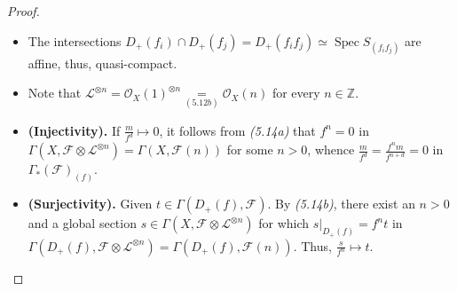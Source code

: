 \documentclass[11pt,a4paper,footinclude=true,headinclude=true]{scrbook} %
\DeclareMathOperator{\Spec}{Spec}
\newcommand{\FF}{\mathscr{F}}
\newcommand{\LL}{\mathscr{L}}
\newcommand{\OO}{\mathcal{O}}
\newcommand{\<}{\langle}
\newcommand{\>}{\rangle}
\begin{document}
\begin{proof}
\begin{itemize}
\begin{itemize}
             \item The intersections $D_+(f_i)\cap D_+(f_j)=D_+(f_if_j)\simeq\Spec S_{(f_if_j)}$ are affine, thus, quasi-compact.
             \item Note that $\LL^{\otimes n}=\OO_X(1)^{\otimes n}\underset{(5.12b)}{=}\OO_X(n)$ for every $n\in\mathbb{Z}$.
             \item \textbf{(Injectivity).} If $\frac{m}{f^d}\mapsto0$, it follows from \textit{(5.14a)} that $f^n=0$ in $\Gamma(X,\FF\otimes\LL^{\otimes n})=\Gamma(X,\FF(n))$ for some $n>0$, whence $\frac{m}{f^d}=\frac{f^nm}{f^{n+d}}=0$ in $\Gamma_\ast(\FF)_{(f)}$.
             \item \textbf{(Surjectivity).} Given $t\in\Gamma(D_+(f),\FF)$. By \textit{(5.14b)}, there exist an $n>0$ and a global section $s\in\Gamma(X,\FF\otimes\LL^{\otimes n})$ for which $s|_{D_+(f)}=f^nt$ in $\Gamma(D_+(f),\FF\otimes\LL^{\otimes n})=\Gamma(D_+(f),\FF(n))$. Thus, $\frac{s}{f^n}\mapsto t$.
         \end{itemize}
    \end{itemize}
\end{proof}
\end{document}
